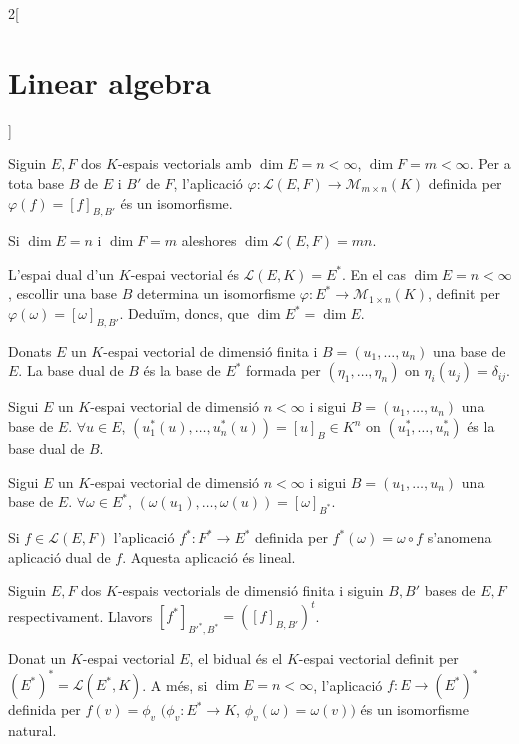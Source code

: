 \documentclass[../../../main.tex]{subfiles}
\begin{document}
\begin{multicols}{2}[\section{Linear algebra}]
\begin{lemma}
\end{lemma}
\begin{prop}
Siguin $E,F$ dos $K$-espais vectorials amb $\dim E=n<\infty$, $\dim F=m<\infty$. Per a tota base $B$ de $E$ i $B'$ de $F$, l'aplicació $\varphi:\mathcal{L}(E,F)\rightarrow\mathcal{M}_{m\times n}(K)$ definida per $\varphi(f)=[f]_{B,B'}$ és un isomorfisme.
\end{prop}
\begin{corollary}
Si $\dim E=n$ i $\dim F=m$ aleshores $\dim \mathcal{L}(E,F)=mn$.
\end{corollary}
\begin{definition}
L'espai dual d'un $K$-espai vectorial és $\mathcal{L}(E,K)=E^*$. En el cas $\dim E=n<\infty$, escollir una base $B$ determina un isomorfisme $\varphi:E^*\rightarrow\mathcal{M}_{1\times n}(K)$, definit per $\varphi(\omega)=[\omega]_{B,B'}$. Deduïm, doncs, que $\dim E^*=\dim E$.
\end{definition}
\begin{definition}
Donats $E$ un $K$-espai vectorial de dimensió finita i $B=(u_1,\ldots,u_n)$ una base de $E$. La base dual de $B$ és la base de $E^*$ formada per $(\eta_1,\ldots,\eta_n)$ on $\eta_i(u_j)=\delta_{ij}$.
\end{definition}
\begin{lemma}
Sigui $E$ un $K$-espai vectorial de dimensió $n<\infty$ i sigui $B=(u_1,\ldots,u_n)$ una base de $E$. $\forall u\in E$, $(u_1^*(u),\ldots,u_n^*(u))=[u]_B\in K^n$ on $(u_1^*,\ldots,u_n^*)$ és la base dual de $B$.
\end{lemma}
\begin{lemma}
Sigui $E$ un $K$-espai vectorial de dimensió $n<\infty$ i sigui $B=(u_1,\ldots,u_n)$ una base de $E$. $\forall \omega\in E^*$, $(\omega(u_1),\ldots,\omega(u))=[\omega]_{B^*}$.
\end{lemma}
\begin{definition}
Si $f\in \mathcal{L}(E,F)$ l'aplicació $f^*:F^*\rightarrow E^*$ definida per $f^*(\omega)=\omega\circ f$ s'anomena aplicació dual de $f$. Aquesta aplicació és lineal.
\end{definition}
\begin{theorem}
Siguin $E,F$ dos $K$-espais vectorials de dimensió finita i siguin $B,B'$ bases de $E,F$ respectivament. Llavors $[f^*]_{B'^*,B^*}=([f]_{B,B'})^t$.
\end{theorem}
\begin{definition}
Donat un $K$-espai vectorial $E$, el bidual és el $K$-espai vectorial definit per $(E^*)^*=\mathcal{L}(E^*,K)$. A més, si $\dim E=n<\infty$, l'aplicació $f:E\rightarrow (E^*)^*$ definida per $f(v)=\phi_v$ $(\phi_v:E^*\rightarrow K$, $\phi_v(\omega)=\omega(v))$ és un isomorfisme natural. 

\end{definition}
\end{multicols}
\end{document}
